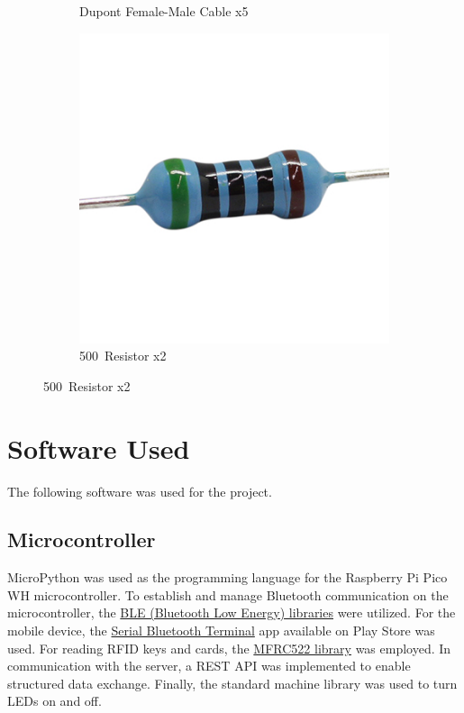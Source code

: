 \documentclass{article}
\begin{document}
\begin{figure}[H]
\begin{subfigure}[b]{0.3\textwidth}
		\caption*{Dupont Female-Male Cable x5}
		\label{fig:cable mh}
	\end{subfigure}
	\hfill
	\begin{subfigure}[b]{0.3\textwidth}
		\includegraphics[width=\textwidth]{../images/resistencia.jpg}
		\caption*{500\textOmega\ Resistor x2}
		\label{fig:resistencia}
	\end{subfigure}
\end{figure}


\section{Software Used}
The following software was used for the project.
\subsection{Microcontroller}
MicroPython was used as the programming language for the Raspberry Pi Pico WH microcontroller.
To establish and manage Bluetooth communication on the microcontroller, the \href{https://github.com/micropython/micropython/tree/master/examples/bluetooth}{BLE (Bluetooth Low Energy) libraries} \cite{micropythonBluetoothExamples} were utilized.
For the mobile device, the \href{https://play.google.com/store/apps/details?id=de.kai_morich.serial_usb_terminal&pcampaignid=web_share}{Serial Bluetooth Terminal} app \cite{sam2023ble} available on Play Store was used. For reading RFID keys and cards, the \href{https://github.com/danjperron/micropython-mfrc522/blob/master/mfrc522.py}{MFRC522 library} \cite{danjperron2022mfrc522} was employed.
In communication with the server, a REST API was implemented to enable structured data exchange. Finally, the standard machine library was used to turn LEDs on and off.
\end{document}

